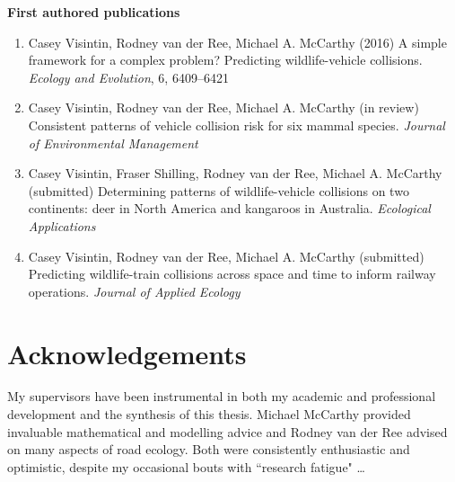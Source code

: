 \documentclass[titlesmallcaps,copyrightpage,examinerscopy]{uomthesis}
\begin{document}
\newpage
\textbf{First authored publications}
\begin{enumerate}
\item Casey Visintin, Rodney van der Ree, Michael A. McCarthy (2016) A simple framework for a complex problem?  Predicting wildlife-vehicle collisions. \textit{Ecology and Evolution}, 6, 6409–6421

\item Casey Visintin, Rodney van der Ree, Michael A. McCarthy (in review) Consistent patterns of vehicle collision risk for six mammal species. \textit{Journal of Environmental Management}

\item Casey Visintin, Fraser Shilling, Rodney van der Ree, Michael A. McCarthy (submitted) Determining patterns of wildlife-vehicle collisions on two continents: deer in North America and kangaroos in Australia. \textit{Ecological Applications}

\item Casey Visintin, Rodney van der Ree, Michael A. McCarthy (submitted) Predicting wildlife-train collisions across space and time to inform railway operations. \textit{Journal of Applied Ecology}
\end{enumerate}

\chapter{Acknowledgements}

My supervisors have been instrumental in both my academic and professional development and the synthesis of this thesis.  Michael McCarthy provided invaluable mathematical and modelling advice and Rodney van der Ree advised on many aspects of road ecology.  Both were consistently enthusiastic and optimistic, despite my occasional bouts with ``research fatigue" \ldots

\tableofcontents
\listoffigures
\listoftables

\mainmatter















%
\end{document}
